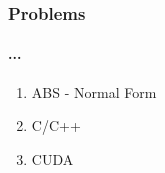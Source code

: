\begin{frame}
\frametitle{Problems}
\framesubtitle{...}
	\begin{enumerate}
		\item ABS - Normal Form
		\item C/C++
		\item CUDA
	\end{enumerate}
\end{frame}
